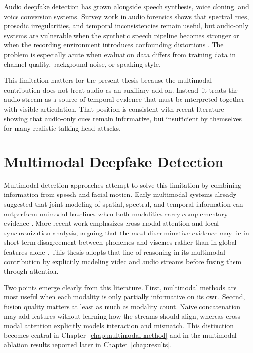 Audio deepfake detection has grown alongside speech synthesis, voice cloning, and voice conversion systems. Survey work in audio forensics shows that spectral cues, prosodic irregularities, and temporal inconsistencies remain useful, but audio-only systems are vulnerable when the synthetic speech pipeline becomes stronger or when the recording environment introduces confounding distortions \cite{Tak2023Audio,mubarak2023survey}. The problem is especially acute when evaluation data differs from training data in channel quality, background noise, or speaking style.

This limitation matters for the present thesis because the multimodal contribution does not treat audio as an auxiliary add-on. Instead, it treats the audio stream as a source of temporal evidence that must be interpreted together with visible articulation. That position is consistent with recent literature showing that audio-only cues remain informative, but insufficient by themselves for many realistic talking-head attacks.

\section{Multimodal Deepfake Detection}

Multimodal detection approaches attempt to solve this limitation by combining information from speech and facial motion. Early multimodal systems already suggested that joint modeling of spatial, spectral, and temporal information can outperform unimodal baselines when both modalities carry complementary evidence \cite{lewis2020deepfake,parikh2023audio,Yang2023}. More recent work emphasizes cross-modal attention and local synchronization analysis, arguing that the most discriminative evidence may lie in short-term disagreement between phonemes and visemes rather than in global features alone \cite{Katamneni2024,Haliassos2022,Sabir2022}. This thesis adopts that line of reasoning in its multimodal contribution by explicitly modeling video and audio streams before fusing them through attention.

Two points emerge clearly from this literature. First, multimodal methods are most useful when each modality is only partially informative on its own. Second, fusion quality matters at least as much as modality count. Naive concatenation may add features without learning how the streams should align, whereas cross-modal attention explicitly models interaction and mismatch. This distinction becomes central in Chapter~\ref{chap:multimodal-method} and in the multimodal ablation results reported later in Chapter~\ref{chap:results}.

